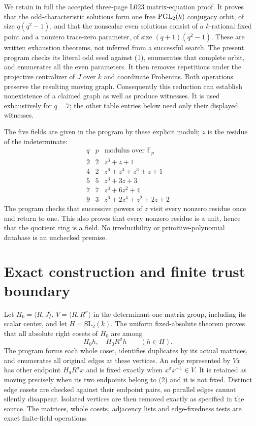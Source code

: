 \documentclass[11pt,a4paper]{article}
\newcommand{\gen}[1]{\langle #1\rangle}
\begin{document}
We retain in full the accepted three-page L023 matrix-equation proof.
It proves that the odd-characteristic solutions form one free
$\operatorname{PGL}_2(k)$ conjugacy orbit, of size $q(q^2-1)$, and that the nonscalar
even solutions consist of a $k$-rational fixed point and a nonzero
trace-zero parameter, of size $(q+1)(q^2-1)$. These are written exhaustion
theorems, not inferred from a successful search. The present program checks
its literal odd seed against (1), enumerates that complete orbit, and
enumerates all the even parameters. It then removes repetitions under
the projective centralizer of $J$ over $k$ and coordinate Frobenius.
Both operations preserve the resulting moving graph. Consequently this
reduction can establish nonexistence of a claimed graph as well as produce
witnesses. It is used exhaustively for $q=7$; the other table entries below
need only their displayed witnesses.

The five fields are given in the program by these explicit moduli; $z$
is the residue of the indeterminate:
\[
\begin{array}{c|c|l}
q&p&\text{modulus over }\mathbb F_p\\\hline
2&2&z^3+z+1\\
4&2&z^6+z^4+z^3+z+1\\
5&5&z^3+3z+3\\
7&7&z^3+6z^2+4\\
9&3&z^6+2z^4+z^2+2z+2
\end{array}
\]
The program checks that successive powers of $z$ visit every nonzero
residue once and return to one. This also proves that every nonzero
residue is a unit, hence that the quotient ring is a field. No irreducibility
or primitive-polynomial database is an unchecked premise.

\section{Exact construction and finite trust boundary}
Let $H_0=\gen{R,J}$, $V=\gen{R,R^\sigma}$ in the determinant-one matrix
group, including its scalar center, and let $H=\mathrm{SL}_2(k)$.
The uniform fixed-absolute theorem proves that all absolute right cosets
of $H_0$ are among
\[
                   H_0h,\quad H_0R^\sigma h\qquad(h\in H). \tag{2}
\]
The program forms each whole coset, identifies duplicates by its actual
matrices, and enumerates all original edges at these vertices. An edge
represented by $Vx$ has other endpoint $H_0R^\sigma x$ and is fixed
exactly when $x^\sigma x^{-1}\in V$. It is retained as moving precisely
when its two endpoints belong to (2) and it is not fixed. Distinct edge
cosets are checked against their endpoint pairs, so parallel edges cannot
silently disappear. Isolated vertices are then removed exactly as specified
in the source. The matrices, whole cosets, adjacency lists and edge-fixedness
tests are exact finite-field operations.
\end{document}
